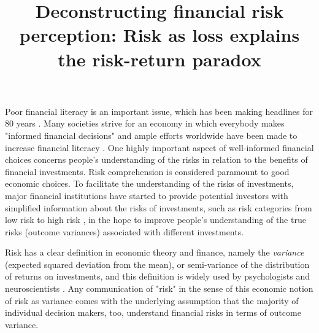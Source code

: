 \documentclass[a4paper,man, natbib,floatsintext]{apa6} %
\title{Deconstructing financial risk perception: Risk as loss explains the risk-return paradox}
\affiliation{University of Basel}
\begin{document}
\maketitle%
%
Poor financial literacy is an important issue, which has been making headlines for 80 years \citep{carrns2019,nyt1939}. Many societies strive for an economy in which everybody makes "informed financial decisions" \citep[][p. 6]{FinancialLitear2011} and ample efforts worldwide have been made to increase financial literacy \citep{OECD2019}. One highly important aspect of well-informed financial choices concerns people's understanding of the risks in relation to the  benefits of financial investments. Risk comprehension is considered paramount to good economic choices. To facilitate the understanding of the risks of investments, major financial institutions have started to provide potential investors with simplified information about the risks of investments, such as risk categories from low risk to high risk \citep[e.g., ][]{postfinance2019}, in the hope to improve people's understanding of the true risks (outcome variances) associated with different investments.

Risk has a clear definition in economic theory and finance, namely the \textit{variance} (expected squared deviation from the mean), or semi-variance of the distribution of returns on investments, and this definition is widely used by psychologists and neuroscientists \citep[e.g.,][]{Nosic2010, Coombs1960, Mishra2016,Rushworth2008, Preuschoff2006, Fujimoto2016}. Any communication of "risk" in the sense of this economic notion of risk as variance comes with the underlying assumption that the majority of individual decision makers, too, understand financial risks in terms of outcome variance.
\end{document}

